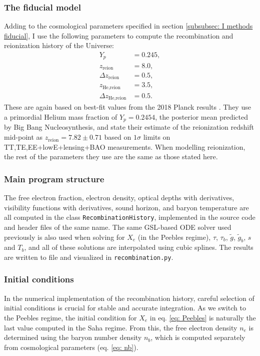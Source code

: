 \documentclass{aa}
\numberwithin{equation}{section}
\numberwithin{table}{section}
\numberwithin{figure}{section}
\begin{document}
\subsubsection{The fiducial model}
Adding to the cosmological parameters specified in section \ref{subsubsec: I methods fiducial}, I use the following parameters to compute the recombination and reionization history of the Universe:
\begin{align*}
  Y_p &= 0.245,
  \\
  z_\text{reion} &= 8.0,
  \\
  \Delta z_\text{reion} &= 0.5,
  \\
  z_\text{He,reion} &= 3.5,
  \\
  \Delta z_\text{He,reion} &= 0.5.
\end{align*}
These are again based on best-fit values from the 2018 Planck results \citep[see][]{Planck}. They use a primordial Helium mass fraction of $Y_p=0.2454$, the posterior mean predicted by Big Bang Nucleosynthesis, and state their estimate of the reionization redshift mid-point as $z_\text{reion}=7.82\pm0.71$ based on $1\sigma$ limits on TT,TE,EE+lowE+lensing+BAO measurements. When modelling reionization, the rest of the parameters they use are the same as those stated here.

\subsubsection{Main program structure}
The free electron fraction, electron density, optical depths with derivatives, visibility functions with derivatives, sound horizon, and baryon temperature are all computed in the class \verb|RecombinationHistory|, implemented in the source code and header files of the same name. The same GSL-based ODE solver used previously is also used when solving for $X_e$ (in the Peebles regime), $\tau$, $\tau_b$, $\tilde{g}$, $\tilde{g}_b$, $s$ and $T_b$, and all of these solutions are interpolated using cubic splines. The results are written to file and visualized in \verb|recombination.py|. 


\subsubsection{Initial conditions}
In the numerical implementation of the recombination history, careful selection of initial conditions is crucial for stable and accurate integration. As we switch to the Peebles regime, the initial condition for $X_e$ in eq. \eqref{eq: Peebles} is naturally the last value computed in the Saha regime. From this, the free electron density $n_e$ is determined using the baryon number density $n_b$, which is computed separately from cosmological parameters (eq. \eqref{eq: nb}). 
\end{document}
